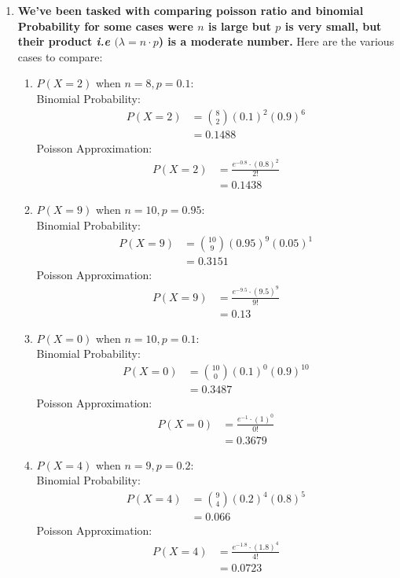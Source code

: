 \documentclass{article}
\begin{document}
\begin{enumerate}
\newpage
\item 
  \textbf{We've been tasked with comparing poisson ratio and binomial Probability for some cases were $n$ is large but $p$ is very small, but their product \textit{i.e} $(\lambda = n\cdot p$) is a moderate number.}
  Here are the various cases to compare:
  \begin{enumerate}
    \item 
    \( P(X = 2) \) when \( n = 8, p = 0.1 \):\\
    Binomial Probability:
    \begin{align*}
      P(X = 2) &= \binom{8}{2} (0.1)^2 (0.9)^6 \\ 
      &= 0.1488
    \end{align*}   
    Poisson Approximation:
    \begin{align*}
      P(X = 2) &= \frac{e^{-0.8} \cdot (0.8)^2}{2!}\\
      &= 0.1438
    \end{align*}
    \item 
    \( P(X = 9) \) when \( n = 10, p = 0.95 \):\\
    Binomial Probability:
    \begin{align*}
      P(X = 9) &= \binom{10}{9} (0.95)^9 (0.05)^1 \\ 
      &= 0.3151
    \end{align*}   
    Poisson Approximation:
    \begin{align*}
      P(X = 9) &= \frac{e^{-9.5} \cdot (9.5)^9}{9!}\\
      &= 0.13
    \end{align*}
    \item 
    \( P(X = 0) \) when \( n = 10, p = 0.1 \):\\
    Binomial Probability:
    \begin{align*}
      P(X = 0) &= \binom{10}{0} (0.1)^0 (0.9)^{10} \\ 
      &= 0.3487
    \end{align*}   
    Poisson Approximation:
    \begin{align*}
      P(X = 0) &= \frac{e^{-1} \cdot (1)^0}{0!}\\
      &= 0.3679
    \end{align*}
    \item 
    \( P(X = 4) \) when \( n = 9, p = 0.2 \):\\
    Binomial Probability:
    \begin{align*}
      P(X = 4) &= \binom{9}{4} (0.2)^4 (0.8)^5 \\ 
      &= 0.066
    \end{align*}   
    Poisson Approximation:
    \begin{align*}
      P(X = 4) &= \frac{e^{-1.8} \cdot (1.8)^4}{4!}\\
      &= 0.0723
    \end{align*}
  \end{enumerate}
\end{enumerate}
\end{document}
